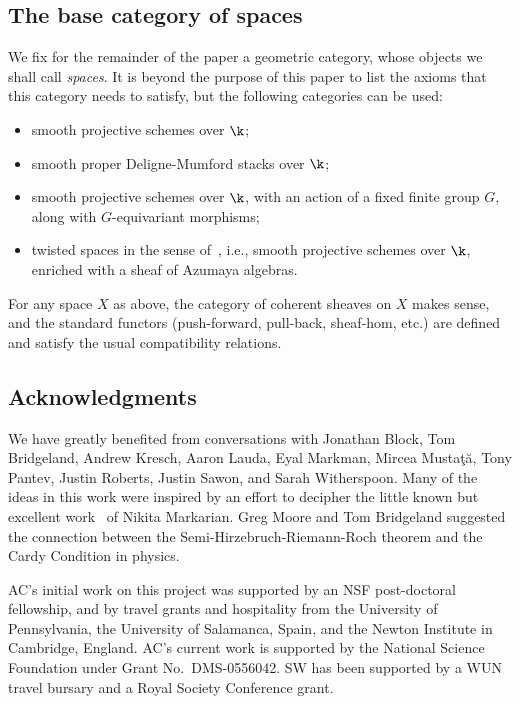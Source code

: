  \subsection*{The base category of spaces}
We fix for the remainder of the paper a geometric category, whose
objects we shall call \emph{spaces}.  It is beyond the purpose of this
paper to list the axioms that this category needs to satisfy, but the
following categories can be used:
\begin{itemize}
\item smooth projective schemes over $\k$;
\item smooth proper Deligne-Mumford stacks over $\k$;
\item smooth projective schemes over $\k$, with an action of a fixed
  finite group $G$, along with $G$-equivariant morphisms;
\item twisted spaces in the sense of~\cite{Cal}, i.e., smooth
  projective schemes over $\k$, enriched with a sheaf of Azumaya
  algebras.
\end{itemize}
For any space $X$ as above, the category of coherent sheaves on $X$
makes sense, and the standard functors (push-forward, pull-back,
sheaf-hom, {etc}.)  are defined and satisfy the usual compatibility
relations.

\subsection*{Acknowledgments} We have greatly benefited from
conversations with Jonathan Block, Tom Bridgeland, Andrew Kresch,
Aaron Lauda, Eyal Markman, Mircea Musta\c t\u a, Tony Pantev, Justin
Roberts, Justin Sawon, and Sarah Witherspoon. Many of the ideas in
this work were inspired by an effort to decipher the little known but
excellent work~\cite{Mar} of Nikita Markarian. Greg Moore and Tom
Bridgeland suggested the connection between the Semi-Hirzebruch-Riemann-Roch
theorem and the Cardy Condition in physics.

AC's initial work on this project was supported by an NSF
post-doctoral fellowship, and by travel grants and hospitality from
the University of Pennsylvania, the University of Salamanca, Spain,
and the Newton Institute in Cambridge, England.  AC's current work is
supported by the National Science Foundation under Grant No.\
DMS-0556042.  SW has been supported by a WUN travel bursary and a
Royal Society Conference grant.
